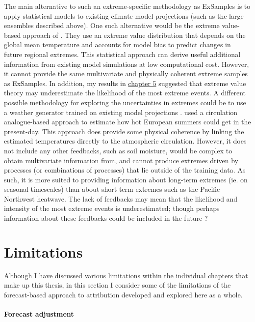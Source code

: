    The main alternative to such an extreme-specific methodology as ExSamples is to apply statistical models to existing climate model projections (such as the large ensembles described above). One such alternative would be the extreme value-based approach of \citet{brown_climate_2014}. They use an extreme value distribution that depends on the global mean temperature and accounts for model bias to predict changes in future regional extremes. This statistical approach can derive useful additional information from existing model simulations at low computational cost. However, it cannot provide the same multivariate and physically coherent extreme samples as ExSamples. In addition, my results in \hyperref[ch5]{chapter 5} suggested that extreme value theory may underestimate the likelihood of the most extreme events. A different possible methodology for exploring the uncertainties in extremes could be to use a weather generator trained on existing model projections \citep{yiou_anawege_2014}. \citet{yiou_simulation_2020} used a circulation analogue-based approach to estimate how hot European summers could get in the present-day. This approach does provide some physical coherence by linking the estimated temperatures directly to the atmospheric circulation. However, it does not include any other feedbacks, such as soil moisture, would be complex to obtain multivariate information from, and cannot produce extremes driven by processes (or combinations of processes) that lie outside of the training data. As such, it is more suited to providing information about long-term extremes (ie. on seasonal timescales) than about short-term extremes such as the Pacific Northwest heatwave. The lack of feedbacks may mean that the likelihood and intensity of the most extreme events is underestimated; though perhaps information about these feedbacks could be included in the future \citep{suarez-gutierrez_dynamical_2020}? 

\section{Limitations}\label{discussion:limitations}

  Although I have discussed various limitations within the individual chapters that make up this thesis, in this section I consider some of the limitations of the forecast-based approach to attribution developed and explored here as a whole.

  \paragraph*{Forecast adjustment}

